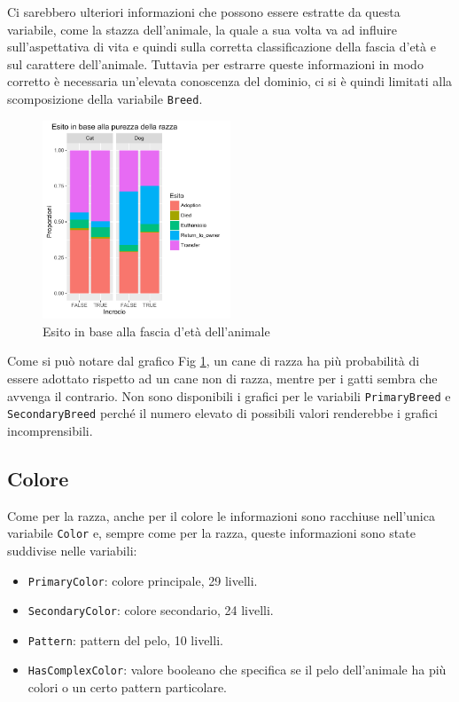 Ci sarebbero ulteriori informazioni che possono essere estratte da questa variabile, come la stazza dell'animale, la quale a sua volta va ad influire sull'aspettativa di vita e quindi sulla corretta classificazione della fascia d'età e sul carattere dell'animale. Tuttavia per estrarre queste informazioni in modo corretto è necessaria un'elevata conoscenza del dominio, ci si è quindi limitati alla scomposizione della variabile \texttt{Breed}.

\begin{figure}[htbp]
	\centering
	\includegraphics[width=0.5\textwidth]{./grafici/esito_mix.pdf}
	\caption{Esito in base alla fascia d'età dell'animale}\label{fig-mix}
\end{figure}


Come si può notare dal grafico Fig \ref{fig-mix}, un cane di razza ha più probabilità di essere adottato rispetto ad un cane non di razza, mentre per i gatti sembra che avvenga il contrario. Non sono disponibili i grafici per le variabili \texttt{PrimaryBreed} e \texttt{SecondaryBreed} perché il numero elevato di possibili valori renderebbe i grafici incomprensibili.

\subsection{Colore}

Come per la razza, anche per il colore le informazioni sono racchiuse nell'unica variabile \texttt{Color} e, sempre come per la razza, queste informazioni sono state suddivise nelle variabili:

\begin{itemize}
	\item \texttt{PrimaryColor}: colore principale, 29 livelli.
	\item \texttt{SecondaryColor}: colore secondario, 24 livelli.
	\item \texttt{Pattern}: pattern del pelo, 10 livelli.
	\item \texttt{HasComplexColor}: valore booleano che specifica se il pelo dell'animale ha più colori o un certo pattern particolare.
\end{itemize}

